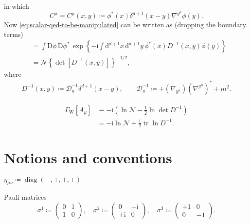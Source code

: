 \documentclass[12pt]{article}
\newcommand\mi{\mathrm{i}} %
\newcommand\dif{\mathrm{d}}
\newcommand\Dif{\mathrm{D}}
\DeclareMathOperator{\diag}{diag}
\DeclareMathOperator{\tr}{tr}
\DeclareMathOperator{\Tr}{Tr}
\newcommand{\rbr}[1]{{\left(#1\right)}}
\newcommand{\cbr}[1]{{\left\{#1\right\}}}
\newcommand{\rfun}[2]{{#1}\mathopen{}\left(#2\right)\mathclose{}}
\newcommand{\sfun}[2]{{#1}\mathopen{}\left[#2\right]\mathclose{}}
\newcommand{\cfun}[2]{{#1}\mathopen{}\left\{#2\right\}\mathclose{}}
\begin{document}
in which
\begin{equation}
C^\mu = \rfun{C^\mu}{x,y} \coloneqq \rfun{\phi^*}{x} 
\rfun{\delta^{d+1}}{x-y} \nabla^{y^\mu}\rfun{\phi}{y}.
\end{equation}
Now \cref{eq:scalar-qed-to-be-manipulated} can be written as (dropping the 
boundary terms)
\begin{align}
&= \int\Dif\phi\,\Dif\phi^*\,
\cfun{\exp}{-\mi\int\dif^{d+1} x\,\dif^{d+1} y\,
\rfun{\phi^*}{x} \rfun{D^{-1}}{x, y} \rfun{\phi}{y}}
\nonumber \\
&= \mathcal{N}\cbr{\sfun{\det}{\rfun{D^{-1}}{x, y}}}^{-1/2},
\end{align}
where
\begin{align}
\rfun{D^{-1}}{x, y} \coloneqq \mathcal{D}^{-1}_y \rfun{\delta^{d+1}}{x-y},\qquad
\mathcal{D}^{-1}_y \coloneqq +\rbr{\nabla_{y^\mu}}\rbr{\nabla^{y^\mu}}^* + m^2.
\end{align}

\begin{align}
\sfun{\varGamma_\text{W}}{A_\mu} &\equiv
-\mi\rbr{\ln\mathcal{N} - \frac{1}{2} \ln \det D^{-1}} \nonumber \\
&= -\mi\ln\mathcal{N} + \frac{\mi}{2} \tr \ln D^{-1}.
\end{align}




\cite{weisskopf1936}




\appendix

\section{Notions and conventions}

$\eta_{\mu\nu} \coloneqq \rfun{\diag}{-, +, +, +}$

Pauli matrices
\begin{equation}
\sigma^1 \coloneqq \begin{pmatrix} 0 & 1 \\ 1 & 0 \end{pmatrix},\quad
\sigma^2 \coloneqq \begin{pmatrix} 0 & -\mi \\ +\mi & 0 \end{pmatrix},\quad
\sigma^3 \coloneqq \begin{pmatrix} +1 & 0 \\ 0 & -1 \end{pmatrix}.
\end{equation}
\end{document}

